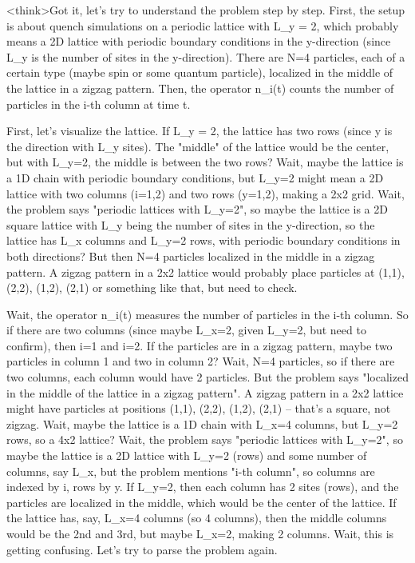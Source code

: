 <think>Got it, let's try to understand the problem step by step. First, the setup is about quench simulations on a periodic lattice with L_y = 2, which probably means a 2D lattice with periodic boundary conditions in the y-direction (since L_y is the number of sites in the y-direction). There are N=4 particles, each of a certain type (maybe spin or some quantum particle), localized in the middle of the lattice in a zigzag pattern. Then, the operator n_i(t) counts the number of particles in the i-th column at time t.

First, let's visualize the lattice. If L_y = 2, the lattice has two rows (since y is the direction with L_y sites). The "middle" of the lattice would be the center, but with L_y=2, the middle is between the two rows? Wait, maybe the lattice is a 1D chain with periodic boundary conditions, but L_y=2 might mean a 2D lattice with two columns (i=1,2) and two rows (y=1,2), making a 2x2 grid. Wait, the problem says "periodic lattices with L_y=2", so maybe the lattice is a 2D square lattice with L_y being the number of sites in the y-direction, so the lattice has L_x columns and L_y=2 rows, with periodic boundary conditions in both directions? But then N=4 particles localized in the middle in a zigzag pattern. A zigzag pattern in a 2x2 lattice would probably place particles at (1,1), (2,2), (1,2), (2,1) or something like that, but need to check.

Wait, the operator n_i(t) measures the number of particles in the i-th column. So if there are two columns (since maybe L_x=2, given L_y=2, but need to confirm), then i=1 and i=2. If the particles are in a zigzag pattern, maybe two particles in column 1 and two in column 2? Wait, N=4 particles, so if there are two columns, each column would have 2 particles. But the problem says "localized in the middle of the lattice in a zigzag pattern". A zigzag pattern in a 2x2 lattice might have particles at positions (1,1), (2,2), (1,2), (2,1) – that's a square, not zigzag. Wait, maybe the lattice is a 1D chain with L_x=4 columns, but L_y=2 rows, so a 4x2 lattice? Wait, the problem says "periodic lattices with L_y=2", so maybe the lattice is a 2D lattice with L_y=2 (rows) and some number of columns, say L_x, but the problem mentions "i-th column", so columns are indexed by i, rows by y. If L_y=2, then each column has 2 sites (rows), and the particles are localized in the middle, which would be the center of the lattice. If the lattice has, say, L_x=4 columns (so 4 columns), then the middle columns would be the 2nd and 3rd, but maybe L_x=2, making 2 columns. Wait, this is getting confusing. Let's try to parse the problem again.

